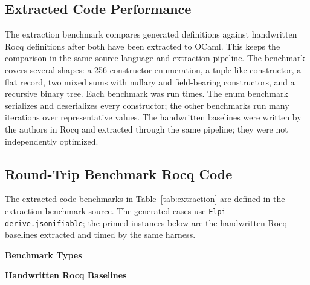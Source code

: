 \subsection{Extracted Code Performance}

The extraction benchmark compares generated definitions against handwritten
Rocq definitions after both have been extracted to OCaml.  This keeps the
comparison in the same source language and extraction pipeline.  The benchmark
covers several shapes: a 256-constructor enumeration, a tuple-like constructor,
a flat record, two mixed sums with nullary and field-bearing constructors, and a
recursive binary tree.  Each benchmark was run
\JsonifiableExtractionGeneratedRuns{} times.  The enum benchmark serializes and
deserializes every constructor; the other benchmarks run many iterations over
representative values.  The handwritten baselines were written by the authors in
Rocq and extracted through the same pipeline; they were not independently
optimized.

\subsection{Round-Trip Benchmark Rocq Code}

The extracted-code benchmarks in Table~\ref{tab:extraction} are defined in the
extraction benchmark source.  The generated cases use
\texttt{Elpi derive.jsonifiable}; the primed instances below are the handwritten
Rocq baselines extracted and timed by the same harness.

\noindent\textbf{Benchmark Types}









\noindent\textbf{Handwritten Rocq Baselines}

